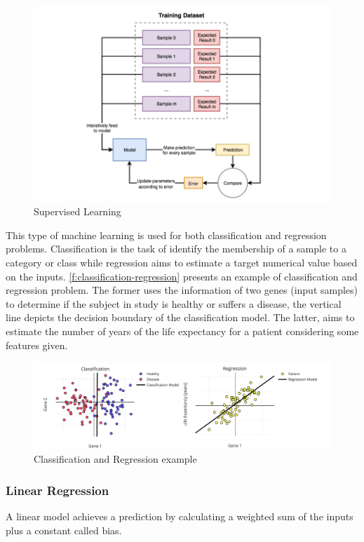 \begin{figure}[h]
\centering
\includegraphics[width=\linewidth]{figures/Ch2/Supervised-Learning.png}
\caption{Supervised Learning}
\label{f:supervised-learning}
\end{figure}

This type of machine learning is used for both classification and regression problems. Classification is the task of identify the membership of a sample to a category or class while regression aims to estimate a target numerical value based on the inputs. \autoref{f:classification-regression} presents an example of classification and regression problem. The former uses the information of two genes (input samples) to determine if the subject in study is healthy or suffers a disease, the vertical line depicts the decision boundary of the classification model. The latter, aims to estimate the number of years of the life expectancy for a patient considering some features given. 

\begin{figure}[h]
\centering
\includegraphics[width=\linewidth]{figures/Ch2/Regression-Classification.png}
\caption{Classification and Regression example}
\label{f:classification-regression}
\end{figure}

\subsubsection{Linear Regression}
A linear model achieves a prediction by calculating a weighted sum of the inputs plus a constant called bias.

